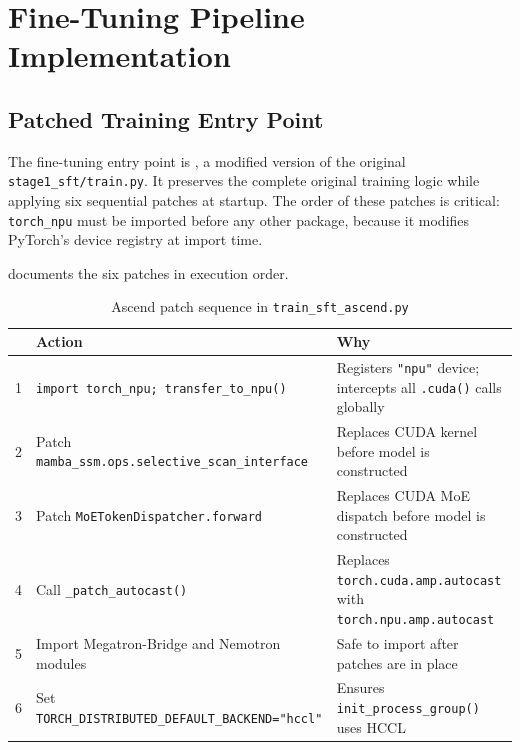 
\section{Fine-Tuning Pipeline Implementation}
\label{sec:training-pipeline}

\subsection{Patched Training Entry Point}
\label{sec:train-entry-point}

The fine-tuning entry point is ,
a modified version of the original \texttt{stage1\_sft/train.py}.
It preserves the complete original training logic while applying
six sequential patches at startup. The order of these patches is
critical: \texttt{torch\_npu} must be imported before any other
package, because it modifies PyTorch's device registry at import
time.

 documents the six patches in execution order.

\begin{table}[htbp]
  \centering
  \caption{Ascend patch sequence in \texttt{train\_sft\_ascend.py}}
  \label{tab:patch-sequence}
  \begin{tabularx}{\textwidth}{lXX}
    \toprule
    \tableheader{Step & Action & Why} \\
    \midrule
    1 & \texttt{import torch\_npu;
        transfer\_to\_npu()}
      & Registers \texttt{"npu"} device; intercepts all
        \texttt{.cuda()} calls globally \\
    \rowcolor{TableRowOdd}
    2 & Patch \texttt{mamba\_ssm.ops.selective\_scan\_interface}
      & Replaces CUDA kernel before model is constructed \\
    3 & Patch \texttt{MoETokenDispatcher.forward}
      & Replaces CUDA MoE dispatch before model is constructed \\
    \rowcolor{TableRowOdd}
    4 & Call \texttt{\_patch\_autocast()}
      & Replaces \texttt{torch.cuda.amp.autocast} with
        \texttt{torch.npu.amp.autocast} \\
    5 & Import Megatron-Bridge and Nemotron modules
      & Safe to import after patches are in place \\
    \rowcolor{TableRowOdd}
    6 & Set \texttt{TORCH\_DISTRIBUTED\_DEFAULT\_BACKEND="hccl"}
      & Ensures \texttt{init\_process\_group()} uses HCCL \\
    \bottomrule
  \end{tabularx}
\end{table}

